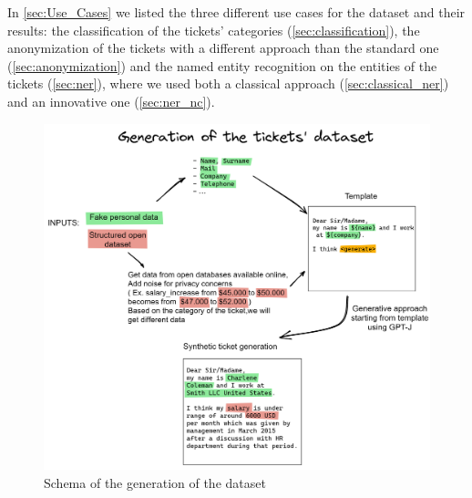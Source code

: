 In \autoref{sec:Use_Cases} we listed the three different use cases for the dataset and their results: the classification of the tickets' categories (\autoref{sec:classification}), the anonymization of the tickets with a different approach than the standard one (\autoref{sec:anonymization}) and the named entity recognition on the entities of the tickets (\autoref{sec:ner}), where we used both a classical approach (\autoref{sec:classical_ner}) and an innovative one (\autoref{sec:ner_nc}).


\begin{figure}[h] 
    \includegraphics[width=\textwidth]{images/complete_schema_part1.png}
    \caption{Schema of the generation of the dataset}
    \label{fig:complete_schema_part1}
\end{figure}

